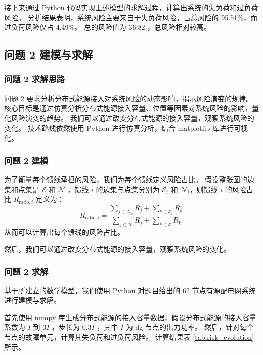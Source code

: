 \documentclass{article}
\begin{document}
接下来通过 Python 代码实现上述模型的求解过程，计算出系统的失负荷和过负荷风险。
分析结果表明，系统风险主要来自于失负荷风险，占总风险的 95.51\%，而过负荷风险仅占 4.49\%。
总的风险值为 36.82 ，总风险相对较高。

\subsection{问题 2 建模与求解}\label{subsec:problem2}

\subsubsection{问题 2 求解思路}\label{subsubsec:problem2_idea}

问题 2 要求分析分布式能源接入对系统风险的动态影响，揭示风险演变的规律。
核心目标是通过仿真分析分布式能源接入容量、位置等因素对系统风险的影响，量化风险演变的趋势。
我们可以通过改变分布式能源的接入容量，观察系统风险的变化。
技术路线依然使用 Python 进行仿真分析，结合 matplotlib 库进行可视化。

\subsubsection{问题 2 建模}\label{subsubsec:problem2_model}

为了衡量每个馈线承担的风险，我们为每个馈线定义风险占比。
假设整张图的边集和点集是 $\mathcal{E}$ 和 $\mathcal{N}$ ，馈线 $i$ 的边集与点集分别为 $\mathcal{E}_i$ 和 $\mathcal{N}_i$，则馈线 $i$ 的风险占比 $R_{\text{ratio},i}$ 定义为：
\begin{equation}\label{eq:ratio}
  R_{\text{ratio},i}
  = \frac
  {\sum_{j\in\mathcal{N}_i} R_j + \sum_{k\in\mathcal{E}_i} R_k}
  {\sum_{j\in\mathcal{N}} R_j + \sum_{k\in\mathcal{E}} R_k}
\end{equation}
从而可以计算出每个馈线的风险占比。

然后，我们可以通过改变分布式能源的接入容量，观察系统风险的变化。

\subsubsection{问题 2 求解}\label{subsubsec:problem2_solve}

基于所建立的数学模型，我们使用 Python 对题目给出的 62 节点有源配电网系统进行建模与求解。

首先使用 numpy 库生成分布式能源的接入容量数据，假设分布式能源的接入容量系数为 $I$ 到 $3I$ ，步长为 $0.3I$ ，其中 $I$ 为 dg 节点的出力功率。
然后，针对每个节点的故障单元，计算其失负荷和过负荷风险。
计算结果表 \ref{tab:risk_evolution} 所示。
\end{document}
